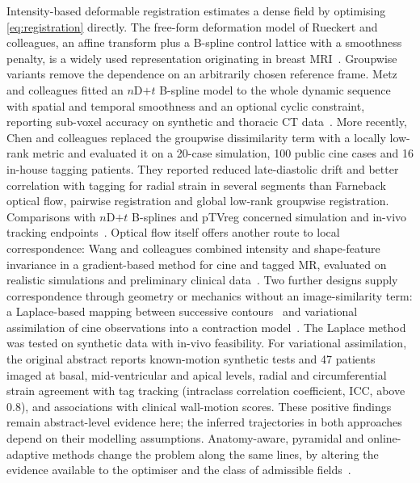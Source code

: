 Intensity-based deformable registration estimates a dense field by optimising \cref{eq:registration} directly. The free-form deformation model of Rueckert and colleagues, an affine transform plus a B-spline control lattice with a smoothness penalty, is a widely used representation originating in breast MRI~\cite{rueckert1999}. Groupwise variants remove the dependence on an arbitrarily chosen reference frame. Metz and colleagues fitted an \(n\)D\(+t\) B-spline model to the whole dynamic sequence with spatial and temporal smoothness and an optional cyclic constraint, reporting sub-voxel accuracy on synthetic and thoracic CT data~\cite{metz2011}. More recently, Chen and colleagues replaced the groupwise dissimilarity term with a locally low-rank metric and evaluated it on a 20-case simulation, 100 public cine cases and 16 in-house tagging patients. They reported reduced late-diastolic drift and better correlation with tagging for radial strain in several segments than Farneback optical flow, pairwise registration and global low-rank groupwise registration. Comparisons with \(n\)D\(+t\) B-splines and pTVreg concerned simulation and in-vivo tracking endpoints~\cite{chen2024}. Optical flow itself offers another route to local correspondence: Wang and colleagues combined intensity and shape-feature invariance in a gradient-based method for cine and tagged MR, evaluated on realistic simulations and preliminary clinical data~\cite{wang2019opticalflow}. Two further designs supply correspondence through geometry or mechanics without an image-similarity term: a Laplace-based mapping between successive contours~\cite{elnakib2015laplace} and variational assimilation of cine observations into a contraction model~\cite{tuyisenge2016assimilation}. The Laplace method was tested on synthetic data with in-vivo feasibility. For variational assimilation, the original abstract reports known-motion synthetic tests and 47 patients imaged at basal, mid-ventricular and apical levels, radial and circumferential strain agreement with tag tracking (intraclass correlation coefficient, ICC, above 0.8), and associations with clinical wall-motion scores. These positive findings remain abstract-level evidence here; the inferred trajectories in both approaches depend on their modelling assumptions. Anatomy-aware, pyramidal and online-adaptive methods change the problem along the same lines, by altering the evidence available to the optimiser and the class of admissible fields~\cite{chen2020anatomy,yu2020mpn,yu2020foal}.


